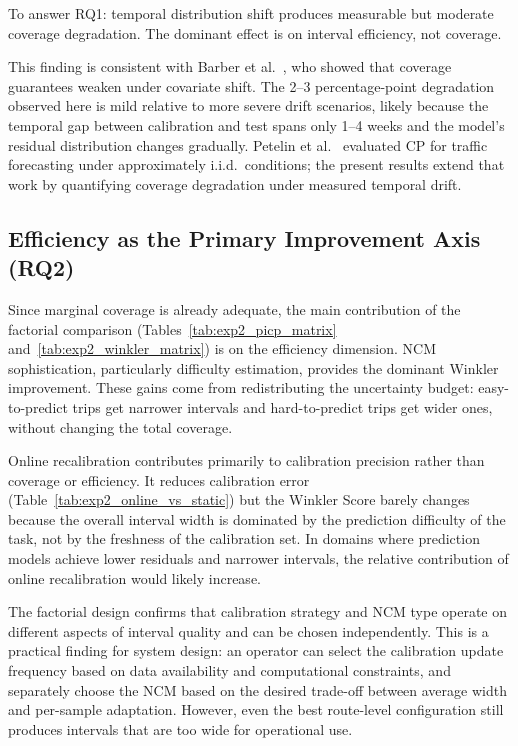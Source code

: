 \documentclass[12pt, a4paper, oneside]{report}
\begin{document}
To answer RQ1: temporal distribution shift produces measurable but moderate coverage degradation. The dominant effect is on interval efficiency, not coverage.

This finding is consistent with Barber et al.~\cite{Barber2023816}, who showed that coverage guarantees weaken under covariate shift. The 2--3 percentage-point degradation observed here is mild relative to more severe drift scenarios, likely because the temporal gap between calibration and test spans only 1--4 weeks and the model's residual distribution changes gradually. Petelin et al.~\cite{Petelin2024} evaluated CP for traffic forecasting under approximately i.i.d.\ conditions; the present results extend that work by quantifying coverage degradation under measured temporal drift.

\subsection{Efficiency as the Primary Improvement Axis (RQ2)}

Since marginal coverage is already adequate, the main contribution of the factorial comparison (Tables~\ref{tab:exp2_picp_matrix} and~\ref{tab:exp2_winkler_matrix}) is on the efficiency dimension. NCM sophistication, particularly difficulty estimation, provides the dominant Winkler improvement. These gains come from redistributing the uncertainty budget: easy-to-predict trips get narrower intervals and hard-to-predict trips get wider ones, without changing the total coverage.

Online recalibration contributes primarily to calibration precision rather than coverage or efficiency. It reduces calibration error (Table~\ref{tab:exp2_online_vs_static}) but the Winkler Score barely changes because the overall interval width is dominated by the prediction difficulty of the task, not by the freshness of the calibration set. In domains where prediction models achieve lower residuals and narrower intervals, the relative contribution of online recalibration would likely increase.

The factorial design confirms that calibration strategy and NCM type operate on different aspects of interval quality and can be chosen independently. This is a practical finding for system design: an operator can select the calibration update frequency based on data availability and computational constraints, and separately choose the NCM based on the desired trade-off between average width and per-sample adaptation. However, even the best route-level configuration still produces intervals that are too wide for operational use.
\end{document}
